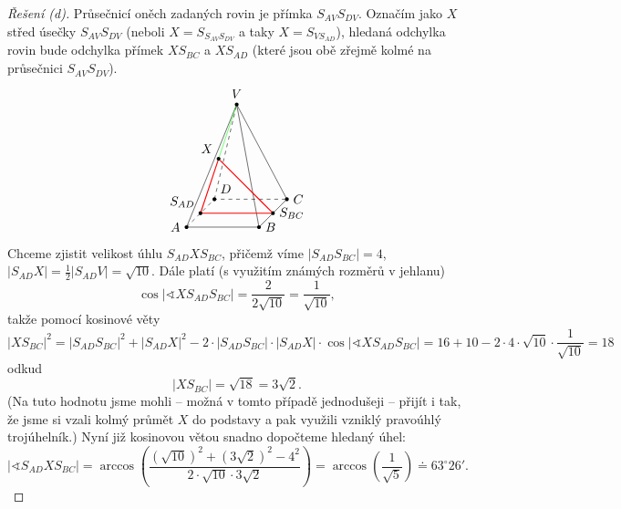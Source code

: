 \documentclass[10pt,a4paper]{extarticle}
\def\bod#1#2#3{\node[circle,fill=black,inner sep=0pt,outer sep=0pt,minimum size=3pt,label=#2:{$#3$}] (#3) at (#1) {};}
\def\zaklad{%
\draw[dashed] (0,0,1) -- (0,0,0) -- (1,0,0);%
\draw (1,0,0)-- (1,0,1) -- (0,0,1);
\draw (1,0,0) -- (.5,1.5,.5) -- (1,0,1);
\draw (0,0,1) -- (.5,1.5,.5);
\draw[dashed] (0,0,0) -- (.5,1.5,.5);
\bod{1,0,0}{right}{C}
\bod{1,0,1}{right}{B}
\bod{0,0,1}{left}{A}
\bod{.5,1.5,.5}{above}{V}
}
\theoremstyle{definition}
\def\st{^\circ}
\begin{document}
\begin{proof}[Řešení (d)]
Průsečnicí oněch zadaných rovin je přímka $S_{AV}S_{DV}$. Označím jako $X$ střed úsečky $S_{AV}S_{DV}$ (neboli $X = S_{S_{AV}S_{DV}}$ a taky $X = S_{VS_{AD}}$), hledaná odchylka rovin bude odchylka přímek $XS_{BC}$ a $XS_{AD}$ (které jsou obě zřejmě kolmé na průsečnici $S_{AV}S_{DV}$).
\[\begin{tikzpicture}[scale=2]
    \zaklad
    \bod{0,0,0}{above right}{D}
    \bod{0,0,.5}{above left}{S_{AD}}
    \bod{1,0,.5}{right}{S_{BC}}
    \bod{.25,.75,.5}{above left}{X}
    \draw[red, thick] (S_{AD}) -- (S_{BC}) -- (X) -- (S_{AD});
    \draw[green] (X) -- (V);
\end{tikzpicture} \]
Chceme zjistit velikost úhlu $S_{AD}XS_{BC}$, přičemž víme $|S_{AD}S_{BC}| = 4$, $|S_{AD}X| = \frac12|S_{AD}V| = \sqrt{10}$. Dále platí (s využitím známých rozměrů v jehlanu)
\[ \cos |\sphericalangle XS_{AD}S_{BC}| = \frac{2}{2\sqrt{10}} = \frac{1}{\sqrt{10}}, \]
takže pomocí kosinové věty
\[ |XS_{BC}|^2 = |S_{AD}S_{BC}|^2 + |S_{AD}X|^2 - 2 \cdot |S_{AD}S_{BC}| \cdot |S_{AD}X| \cdot \cos |\sphericalangle XS_{AD}S_{BC}| =
16 + 10 - 2 \cdot 4 \cdot \sqrt{10} \cdot \frac{1}{\sqrt{10}} = 18
 \]
odkud
\[ |XS_{BC}| = \sqrt{18} = 3 \sqrt2. \]
(Na tuto hodnotu jsme mohli -- možná v tomto případě jednodušeji -- přijít i tak, že jsme si vzali kolmý průmět $X$ do podstavy a pak využili vzniklý pravoúhlý trojúhelník.) Nyní již kosinovou větou snadno dopočteme hledaný úhel:
\[ |\sphericalangle S_{AD}XS_{BC}| = \arccos\left( \frac{(\sqrt{10})^2 + (3\sqrt2)^2 - 4^2}{2 \cdot \sqrt{10} \cdot 3\sqrt2} \right) = \arccos\left(\frac{1}{\sqrt{5}} \right) \doteq 63\st26'. \]
\end{proof}
\end{document}
